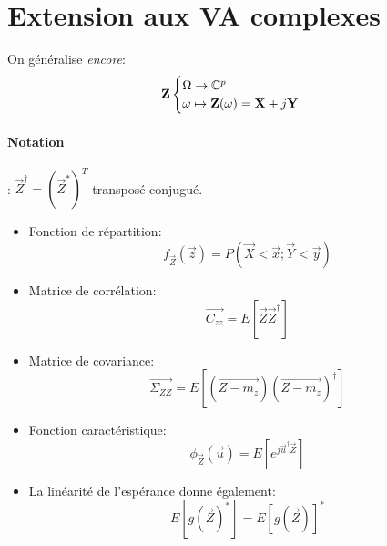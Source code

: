 \documentclass[main.tex]{subfiles}
\begin{document}
\section{Extension aux VA complexes}
\begin{defin}
  On généralise \emph{encore}:
  \[
    \mathbf{Z}
    \begin{cases}
      \Omega \to \mathbb{C}^p\\
      \omega \mapsto \mathbf{Z}(\omega) = \mathbf{X}+j\mathbf{Y}
    \end{cases}
  \]
\end{defin}
\paragraph{Notation} : $\vec{Z}^\dagger = (\vec{Z}^{*})^T$ transposé conjugué.

\begin{prop}
  \begin{itemize}
  \item Fonction de répartition:
    \[
      f_{\vec{Z}}(\vec{z})= P(\vec{X}<\vec{x} ; \vec{Y}< \vec{y})
    \]
  \item Matrice  de corrélation:
    \[
      \vec{C_{zz}} = E[\vec{Z}\vec{Z}^\dagger]
    \]
  \item Matrice de covariance:
    \[
      \vec{\Sigma_{ZZ}} = E[(\vec{Z-m_z})(\vec{Z-m_z})^\dagger]
    \]
  \item Fonction caractéristique:
    \[
      \phi_{\vec{Z}}(\vec{u}) = E[e^{j\vec{u}^\dagger \vec{Z}}]
    \]
  \item La linéarité de l'espérance donne également:
    \[
      E[g(\vec{Z})^*]= E[g(\vec{Z})]^*
    \]
  \end{itemize}
\end{prop}
\end{document}
